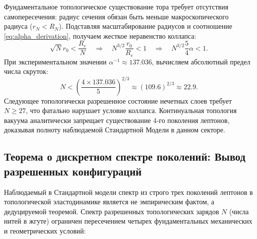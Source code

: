 \documentclass[11pt,a4paper]{article}
\begin{document}
Фундаментальное топологическое существование тора требует отсутствия самопересечения: радиус сечения обязан быть меньше макроскопического радиуса ($r_N < R_N$). Подставляя масштабирование радиусов и соотношение \eqref{eq:alpha_derivation}, получаем жесткое неравенство коллапса:
\begin{equation}
\sqrt{N} r_0 < \frac{R_e}{N} \quad \Longrightarrow \quad N^{3/2} \frac{r_0}{R_e} < 1 \quad \Longrightarrow \quad N^{3/2} \frac{5}{4}\alpha < 1.
\end{equation}
При экспериментальном значении $\alpha^{-1} \approx 137.036$, вычисляем абсолютный предел числа скруток:
\begin{equation}
N < \left( \frac{4 \times 137.036}{5} \right)^{2/3} \approx (109.6)^{2/3} \approx 22.9.
\end{equation}
Следующее топологически разрешенное состояние нечетных слоев требует $N \ge 27$, что фатально нарушает условие коллапса. Континуальная топология вакуума аналитически запрещает существование 4-го поколения лептонов, доказывая полноту наблюдаемой Стандартной Модели в данном секторе.

\subsection{Теорема о дискретном спектре поколений: Вывод разрешенных конфигураций}
Наблюдаемый в Стандартной модели спектр из строго трех поколений лептонов в топологической эластодинамике является не эмпирическим фактом, а дедуцируемой теоремой. Спектр разрешенных топологических зарядов $N$ (числа нитей в жгуте) ограничен пересечением четырех фундаментальных механических и геометрических условий:
\end{document}
